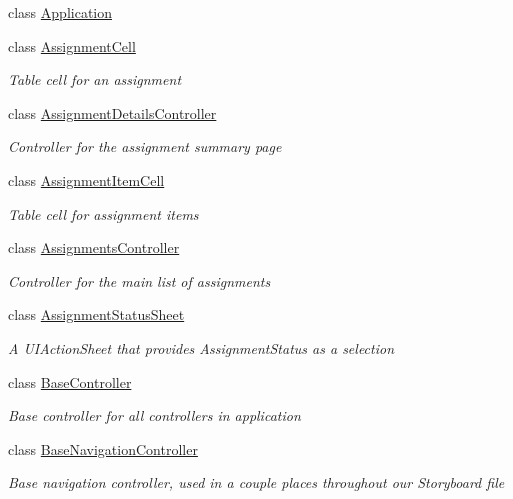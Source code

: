 \begin{DoxyCompactItemize}
class \hyperlink{class_field_service_1_1i_o_s_1_1_application}{Application}
\item 
class \hyperlink{class_field_service_1_1i_o_s_1_1_assignment_cell}{Assignment\+Cell}
\begin{DoxyCompactList}\small\item\em Table cell for an assignment \end{DoxyCompactList}\item 
class \hyperlink{class_field_service_1_1i_o_s_1_1_assignment_details_controller}{Assignment\+Details\+Controller}
\begin{DoxyCompactList}\small\item\em Controller for the assignment summary page \end{DoxyCompactList}\item 
class \hyperlink{class_field_service_1_1i_o_s_1_1_assignment_item_cell}{Assignment\+Item\+Cell}
\begin{DoxyCompactList}\small\item\em Table cell for assignment items \end{DoxyCompactList}\item 
class \hyperlink{class_field_service_1_1i_o_s_1_1_assignments_controller}{Assignments\+Controller}
\begin{DoxyCompactList}\small\item\em Controller for the main list of assignments \end{DoxyCompactList}\item 
class \hyperlink{class_field_service_1_1i_o_s_1_1_assignment_status_sheet}{Assignment\+Status\+Sheet}
\begin{DoxyCompactList}\small\item\em A U\+I\+Action\+Sheet that provides Assignment\+Status as a selection \end{DoxyCompactList}\item 
class \hyperlink{class_field_service_1_1i_o_s_1_1_base_controller}{Base\+Controller}
\begin{DoxyCompactList}\small\item\em Base controller for all controllers in application \end{DoxyCompactList}\item 
class \hyperlink{class_field_service_1_1i_o_s_1_1_base_navigation_controller}{Base\+Navigation\+Controller}
\begin{DoxyCompactList}\small\item\em Base navigation controller, used in a couple places throughout our Storyboard file \end{DoxyCompactList}\item 

\end{DoxyCompactItemize}
